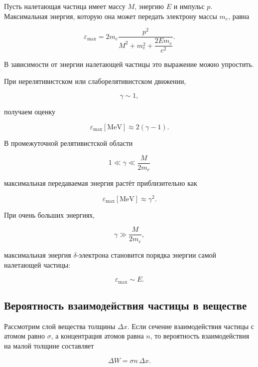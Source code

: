 \documentclass[../final.tex]{subfiles}
\begin{document}
Пусть налетающая частица имеет массу $M$, энергию $E$ и импульс $p$.
Максимальная энергия, которую она может передать электрону массы $m_e$,
равна

\begin{equation*}
    \varepsilon_{\max}
    =
    2m_e
    \frac{p^2}{
        M^2
        +
        m_e^2
        +
        \dfrac{2Em_e}{c^2}
    }.
\end{equation*}

В зависимости от энергии налетающей частицы это выражение можно
упростить.

При нерелятивистском или слаборелятивистском движении,

\[
    \gamma \sim 1,
\]

получаем оценку

\begin{equation*}
    \varepsilon_{\max}[\mathrm{MeV}]
    \approx
    2(\gamma-1).
\end{equation*}

В промежуточной релятивистской области

\[
    1
    \ll
    \gamma
    \ll
    \frac{M}{2m_e}
\]

максимальная передаваемая энергия растёт приблизительно как

\begin{equation*}
    \varepsilon_{\max}[\mathrm{MeV}]
    \approx
    \gamma^2.
\end{equation*}

При очень больших энергиях,

\[
    \gamma
    \gg
    \frac{M}{2m_e},
\]

максимальная энергия $\delta$-электрона становится порядка энергии
самой налетающей частицы:

\[
    \varepsilon_{\max}
    \sim
    E.
\]


\subsection{Вероятность взаимодействия частицы в веществе}

Рассмотрим слой вещества толщины $\Delta x$. Если сечение
взаимодействия частицы с атомом равно $\sigma$, а концентрация атомов
равна $n$, то вероятность взаимодействия на малой толщине составляет

\begin{equation*}
    \Delta W
    =
    \sigma n\,\Delta x.
\end{equation*}
\end{document}
